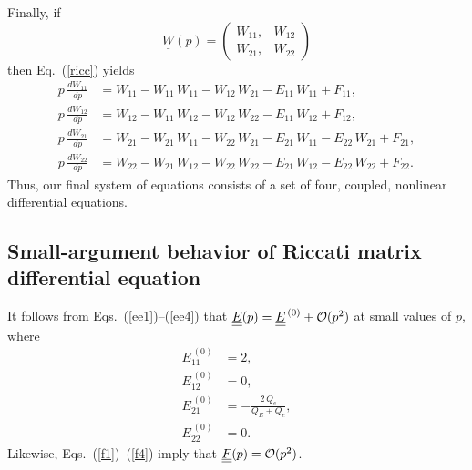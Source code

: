 \documentclass[12pt,prb,aps]{revtex4-1}
\providecommand{\DIFadd}[1]{{\protect\color{blue}\uwave{#1}}} %
\providecommand{\DIFaddbegin}{} %
\providecommand{\DIFaddend}{} %
\begin{document}
Finally, if 
\begin{equation}
\underline{\underline{W}}(p)= \left(\begin{array}{cc} W_{11},&W_{12}\\W_{21},&W_{22}\end{array}\right)
\end{equation}
then Eq.~(\ref{ricc}) yields\DIFaddbegin \DIFadd{, 
}\DIFaddend \begin{align}\label{err1}
p\,\frac{dW_{11}}{dp}  &= W_{11}  - W_{11}\,W_{11}-W_{12}\,W_{21}- E_{11}\,W_{11} + F_{11},\\[0.5ex]
p\,\frac{dW_{12}}{dp} &= W_{12} - W_{11}\,W_{12} - W_{12}\,W_{22} - E_{11}\,W_{12} + F_{12},\\[0.5ex]
p\,\frac{dW_{21}}{dp} &= W_{21} -W_{21}\,W_{11}- W_{22}\,W_{21} - E_{21}\,W_{11} - E_{22}\,W_{21} + F_{21},\\[0.5ex]
p\,\frac{dW_{22}}{dp} &= W_{22} -W_{21}\,W_{12}- W_{22}\,W_{22}- E_{21}\,W_{12} - E_{22}\,W_{22} + F_{22}.\label{err4}
\end{align}
Thus, our final system of equations consists of a set of four, coupled, nonlinear differential equations. 

\subsection{Small-argument behavior of Riccati matrix differential equation}
It follows from Eqs.~(\ref{ee1})--(\ref{ee4})  that  $\underline{\underline{E}}(p) = \underline{\underline{E}}^{\,(0)} + {\cal O}(p^2)$ at small values of $p$,
where 
\begin{align}
E_{11}^{\,(0)} &= 2,\\[0.5ex]
E_{12}^{\,(0)}&=0,\\[0.5ex]
E_{21}^{\,(0)} &= - \frac{2\,Q_e}{Q_E+Q_e},\label{e210}\\[0.5ex]
E_{22}^{\,(0)}&= 0.
\end{align}
Likewise,  Eqs.~(\ref{f1})--(\ref{f4}) imply that $\underline{\underline{F}}(p) ={\cal O}(p^2)$.
\end{document}
